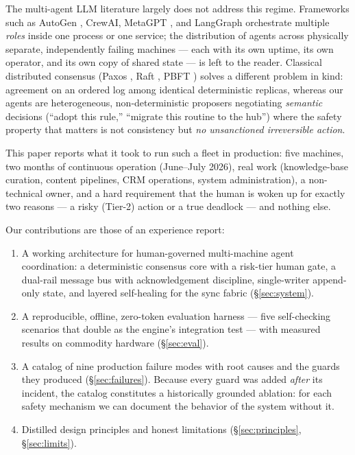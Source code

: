 \documentclass[11pt]{article}
\begin{document}
The multi-agent LLM literature largely does not address this regime. Frameworks such as AutoGen \cite{autogen}, CrewAI, MetaGPT \cite{metagpt}, and LangGraph orchestrate multiple \emph{roles} inside one process or one service; the distribution of agents across physically separate, independently failing machines --- each with its own uptime, its own operator, and its own copy of shared state --- is left to the reader. Classical distributed consensus (Paxos \cite{paxos}, Raft \cite{raft}, PBFT \cite{pbft}) solves a different problem in kind: agreement on an ordered log among identical deterministic replicas, whereas our agents are heterogeneous, non-deterministic proposers negotiating \emph{semantic} decisions (``adopt this rule,'' ``migrate this routine to the hub'') where the safety property that matters is not consistency but \emph{no unsanctioned irreversible action}.

This paper reports what it took to run such a fleet in production: five machines, two months of continuous operation (June--July 2026), real work (knowledge-base curation, content pipelines, CRM operations, system administration), a non-technical owner, and a hard requirement that the human is woken up for exactly two reasons --- a risky (Tier-2) action or a true deadlock --- and nothing else.

Our contributions are those of an experience report:
\begin{enumerate}
\item A working architecture for human-governed multi-machine agent coordination: a deterministic consensus core with a risk-tier human gate, a dual-rail message bus with acknowledgement discipline, single-writer append-only state, and layered self-healing for the sync fabric (\S\ref{sec:system}).
\item A reproducible, offline, zero-token evaluation harness --- five self-checking scenarios that double as the engine's integration test --- with measured results on commodity hardware (\S\ref{sec:eval}).
\item A catalog of nine production failure modes with root causes and the guards they produced (\S\ref{sec:failures}). Because every guard was added \emph{after} its incident, the catalog constitutes a historically grounded ablation: for each safety mechanism we can document the behavior of the system without it.
\item Distilled design principles and honest limitations (\S\ref{sec:principles}, \S\ref{sec:limits}).
\end{enumerate}
\end{document}
